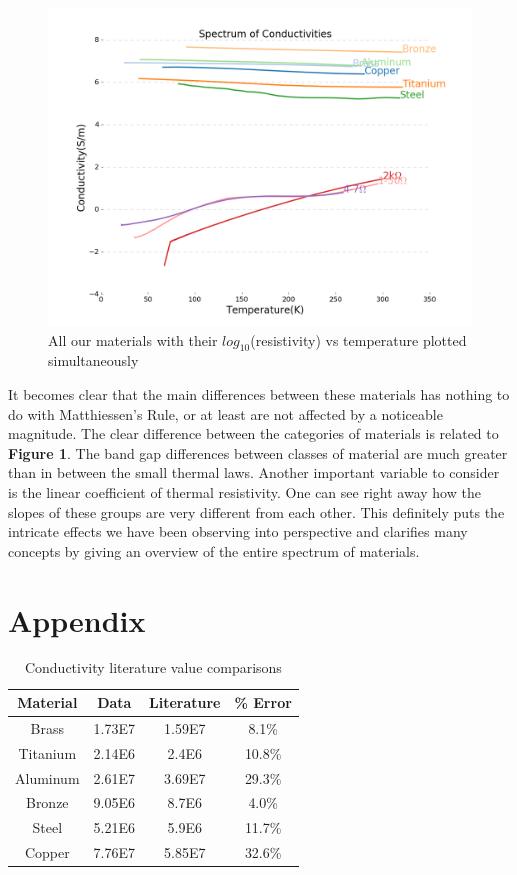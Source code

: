 \documentclass[11pt]{article}
\begin{document}
\begin{figure}[h]
	\centering
	\includegraphics[scale=0.35]{allmats.png}
	\caption{All our materials with their $log_{10}$(resistivity) vs temperature plotted simultaneously}
\end{figure}

It becomes clear that the main differences between these materials has nothing to do with Matthiessen's Rule, or at least are not affected by a noticeable magnitude. The clear difference between the categories of materials is related to \textbf{Figure 1}. The band gap differences between classes of material are much greater than in between the small thermal laws. Another important variable to consider is the linear coefficient of thermal resistivity. One can see right away how the slopes of these groups are very different from each other. This definitely puts the intricate effects we have been observing into perspective and clarifies many concepts by giving an overview of the entire spectrum of materials.

\clearpage
\section*{Appendix}

\begin{table}[h]
	\centering
	\begin{tabular}{||c|c|c|c||}
	\hline
	Material & Data & Literature & \% Error\\
	\hline
	\hline
	Brass & 1.73E7 & 1.59E7 & 8.1\%\\
	\hline
	Titanium & 2.14E6 & 2.4E6 & 10.8\%\\
	\hline
	Aluminum & 2.61E7 & 3.69E7 & 29.3\%\\
	\hline
	Bronze & 9.05E6 & 8.7E6 & 4.0\%\\
	\hline
	Steel & 5.21E6 & 5.9E6 & 11.7\%\\
	\hline
	Copper & 7.76E7 & 5.85E7 & 32.6\%\\
	\hline
	\end{tabular}
	\caption{Conductivity literature value comparisons}
\end{table}
\end{document}
